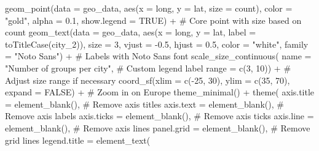 \documentclass[
  letterpaper,
  DIV=11,
  numbers=noendperiod]{scrartcl}
\newenvironment{Shaded}{\begin{snugshade}}{\end{snugshade}}
\newcommand{\AttributeTok}[1]{\textcolor[rgb]{0.40,0.45,0.13}{#1}}
\newcommand{\CommentTok}[1]{\textcolor[rgb]{0.37,0.37,0.37}{#1}}
\newcommand{\ConstantTok}[1]{\textcolor[rgb]{0.56,0.35,0.01}{#1}}
\newcommand{\DecValTok}[1]{\textcolor[rgb]{0.68,0.00,0.00}{#1}}
\newcommand{\FloatTok}[1]{\textcolor[rgb]{0.68,0.00,0.00}{#1}}
\newcommand{\FunctionTok}[1]{\textcolor[rgb]{0.28,0.35,0.67}{#1}}
\newcommand{\NormalTok}[1]{\textcolor[rgb]{0.00,0.23,0.31}{#1}}
\newcommand{\SpecialCharTok}[1]{\textcolor[rgb]{0.37,0.37,0.37}{#1}}
\newcommand{\StringTok}[1]{\textcolor[rgb]{0.13,0.47,0.30}{#1}}
\begin{document}
\begin{Shaded}
\begin{Highlighting}[]
  \FunctionTok{geom\_point}\NormalTok{(}\AttributeTok{data =}\NormalTok{ geo\_data, }\FunctionTok{aes}\NormalTok{(}\AttributeTok{x =}\NormalTok{ long, }\AttributeTok{y =}\NormalTok{ lat, }\AttributeTok{size =}\NormalTok{ count), }
             \AttributeTok{color =} \StringTok{"gold"}\NormalTok{, }\AttributeTok{alpha =} \FloatTok{0.1}\NormalTok{,}
             \AttributeTok{show.legend =} \ConstantTok{TRUE}\NormalTok{) }\SpecialCharTok{+} \CommentTok{\# Core point with size based on count}
  \FunctionTok{geom\_text}\NormalTok{(}\AttributeTok{data =}\NormalTok{ geo\_data, }\FunctionTok{aes}\NormalTok{(}\AttributeTok{x =}\NormalTok{ long, }\AttributeTok{y =}\NormalTok{ lat, }\AttributeTok{label =} \FunctionTok{toTitleCase}\NormalTok{(city\_2)), }
            \AttributeTok{size =} \DecValTok{3}\NormalTok{, }\AttributeTok{vjust =} \SpecialCharTok{{-}}\FloatTok{0.5}\NormalTok{, }\AttributeTok{hjust =} \FloatTok{0.5}\NormalTok{, }\AttributeTok{color =} \StringTok{"white"}\NormalTok{, }\AttributeTok{family =} \StringTok{"Noto Sans"}\NormalTok{) }\SpecialCharTok{+} \CommentTok{\# Labels with Noto Sans font}
  \FunctionTok{scale\_size\_continuous}\NormalTok{(}
    \AttributeTok{name =} \StringTok{"Number of groups per city"}\NormalTok{, }\CommentTok{\# Custom legend label}
    \AttributeTok{range =} \FunctionTok{c}\NormalTok{(}\DecValTok{3}\NormalTok{, }\DecValTok{10}\NormalTok{)) }\SpecialCharTok{+} \CommentTok{\# Adjust size range if necessary}
  \FunctionTok{coord\_sf}\NormalTok{(}\AttributeTok{xlim =} \FunctionTok{c}\NormalTok{(}\SpecialCharTok{{-}}\DecValTok{25}\NormalTok{, }\DecValTok{30}\NormalTok{), }\AttributeTok{ylim =} \FunctionTok{c}\NormalTok{(}\DecValTok{35}\NormalTok{, }\DecValTok{70}\NormalTok{), }\AttributeTok{expand =} \ConstantTok{FALSE}\NormalTok{) }\SpecialCharTok{+} \CommentTok{\# Zoom in on Europe}
  \FunctionTok{theme\_minimal}\NormalTok{() }\SpecialCharTok{+}
  \FunctionTok{theme}\NormalTok{(}
    \AttributeTok{axis.title =} \FunctionTok{element\_blank}\NormalTok{(),        }\CommentTok{\# Remove axis titles}
    \AttributeTok{axis.text =} \FunctionTok{element\_blank}\NormalTok{(),         }\CommentTok{\# Remove axis labels}
    \AttributeTok{axis.ticks =} \FunctionTok{element\_blank}\NormalTok{(),        }\CommentTok{\# Remove axis ticks}
    \AttributeTok{axis.line =} \FunctionTok{element\_blank}\NormalTok{(),         }\CommentTok{\# Remove axis lines}
    \AttributeTok{panel.grid =} \FunctionTok{element\_blank}\NormalTok{(),        }\CommentTok{\# Remove grid lines}
    \AttributeTok{legend.title =} \FunctionTok{element\_text}\NormalTok{(}

\end{Highlighting}
\end{Shaded}
\end{document}
